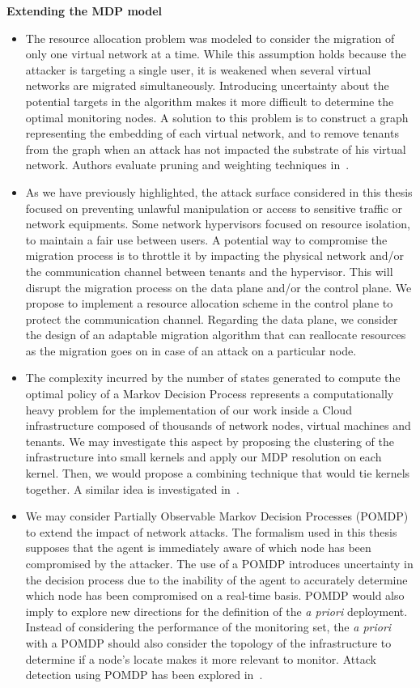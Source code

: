 \newpage
\textbf{Extending the MDP model}
\begin{itemize}
    \item 
    The resource allocation problem was modeled to consider the migration of only one virtual network at a time. While this assumption holds because the attacker is targeting a single user, it is weakened when several virtual networks are migrated simultaneously. Introducing uncertainty about the potential targets in the algorithm makes it more difficult to determine the optimal monitoring nodes. A solution to this problem is to construct a graph representing the embedding of each virtual network, and to remove tenants from the graph when an attack has not impacted the substrate of his virtual network. Authors evaluate pruning and weighting techniques in~\cite{pruning-secu}.

    \item 
    As we have previously highlighted, the attack surface considered in this thesis focused on preventing unlawful manipulation or access to sensitive traffic or network equipments. Some network hypervisors focused on resource isolation, to maintain a fair use between users. A potential way to compromise the migration process is to throttle it by impacting the physical network and/or the communication channel between tenants and the hypervisor. This will disrupt the migration process on the data plane and/or the control plane. We propose to implement a resource allocation scheme in the control plane to protect the communication channel. Regarding the data plane, we consider the design of an adaptable migration algorithm that can reallocate resources as the migration goes on in case of an attack on a particular node. 

    \item 
    The complexity incurred by the number of states generated to compute the optimal policy of a Markov Decision Process represents a computationally heavy problem for the implementation of our work inside a Cloud infrastructure composed of thousands of network nodes, virtual machines and tenants. We may investigate this aspect by proposing the clustering of the infrastructure into small kernels and apply our MDP resolution on each kernel. Then, we would propose a combining technique that would tie kernels together. A similar idea is investigated in~\cite{POMDP-clustering}.

    \item 
    We may consider Partially Observable Markov Decision Processes (POMDP) to extend the impact of network attacks.
    The formalism used in this thesis supposes that the agent is immediately aware of which node has been compromised by the attacker. The use of a POMDP introduces uncertainty in the decision process due to the inability of the agent to accurately determine which node has been compromised on a real-time basis. POMDP would also imply to explore new directions for the definition of the \textit{a priori} deployment. Instead of considering the performance of the monitoring set, the \textit{a priori} with a POMDP should also consider the topology of the infrastructure to determine if a node's locate makes it more relevant to monitor. Attack detection using POMDP has been explored in~\cite{RL-POMDP}.
    

\end{itemize}
